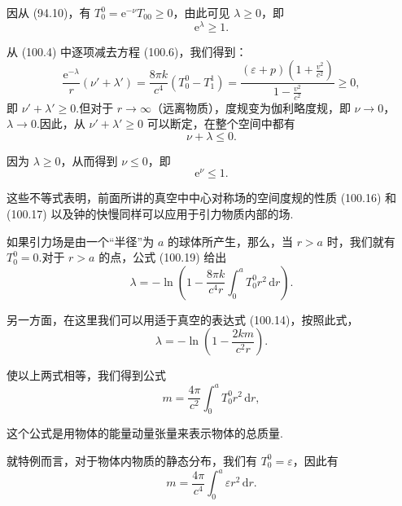 因从 (94.10)，有 $T_0^0=\mathrm{e}^{-\nu}T_{00}\geqslant0$，由此可见 $\lambda\geqslant0$，即
\begin{equation}
  \mathrm{e}^{\lambda}\geqslant1.
\end{equation}

从 (100.4) 中逐项减去方程 (100.6)，我们得到：
\begin{equation*}
  \frac{\mathrm{e}^{-\lambda}}{r}(\nu'+\lambda')
  =\frac{8\pi k}{c^{4}}(T_0^0-T_1^1)
  =\frac{\displaystyle(\varepsilon+p)\left(1+\frac{v^{2}}{c^{2}}\right)}
  {\displaystyle1-\frac{v^{2}}{c^{2}}}\geqslant0,
\end{equation*}
即 $\nu'+\lambda'\geqslant0$.但对于 $r\to\infty$（远离物质），度规变为伽利略度规，即 $\nu\to0$，$\lambda\to0$.因此，从 $\nu'+\lambda'\geqslant0$ 可以断定，在整个空间中都有
\begin{equation}
  \nu+\lambda\leqslant0.
\end{equation}

因为 $\lambda\geqslant0$，从而得到 $\nu\leqslant0$，即
\begin{equation}
  \mathrm{e}^{\nu}\leqslant1.
\end{equation}

这些不等式表明，前面所讲的真空中中心对称场的空间度规的性质 (100.16) 和 (100.17) 以及钟的快慢同样可以应用于引力物质内部的场.

如果引力场是由一个“半径”为 $a$ 的球体所产生，那么，当 $r>a$ 时，我们就有 $T_0^0=0$.对于 $r>a$ 的点，公式 (100.19) 给出
\begin{equation*}
  \lambda=-\ln\left(1-\frac{8\pi k}{c^{4}r}
  \int_{0}^{a}T_0^0r^{2}\,\mathrm{d}r\right).
\end{equation*}

另一方面，在这里我们可以用适于真空的表达式 (100.14)，按照此式，
\begin{equation*}
  \lambda=-\ln\left(1-\frac{2km}{c^{2}r}\right).
\end{equation*}

使以上两式相等，我们得到公式
\begin{equation}
  m=\frac{4\pi}{c^{2}}\int_{0}^{a}T_0^0r^{2}\,\mathrm{d}r,
\end{equation}

这个公式是用物体的能量动量张量来表示物体的总质量.

就特例而言，对于物体内物质的静态分布，我们有 $T_0^0=\varepsilon$，因此有
\begin{equation}
  m=\frac{4\pi}{c^{4}}\int_{0}^{a}\varepsilon r^{2}\,\mathrm{d}r.
\end{equation}

